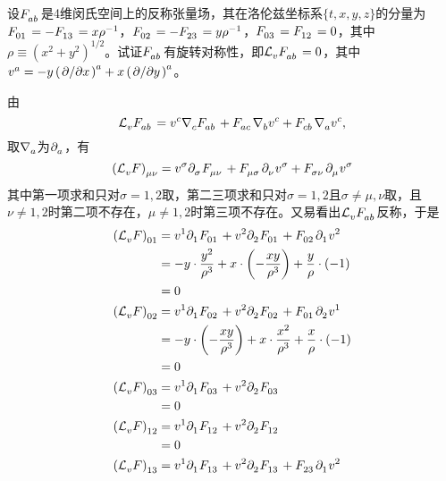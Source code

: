 \begin{xiti}
	\item 设$\tensor{F}{_a_b}$是4维闵氏空间上的反称张量场，其在洛伦兹坐标系$\{t,x,y,z \}$的分量为$\tensor{F}{_0_1}=-\tensor{F}{_1_3}=x \rho^{-1} $，$\tensor{F}{_0_2}=-\tensor{F}{_2_3}=y \rho^{-1} $，$\tensor{F}{_0_3}=\tensor{F}{_1_2}=0 $，其中$\rho\equiv \left(x^2+y^2\right)^{1/2} $。试证$\tensor{F}{_a_b}$有旋转对称性，即$\Ld{v} \tensor{F}{_a_b}=0 $，其中$\tensor{v}{^a}=-y \tensor{\left(\pd{x}\right)}{^a}+x \tensor{\left(\pd{y}\right)}{^a} $。
	
	\begin{zm}
		由\[\Ld{v} \tensor{F}{_a_b} = \tensor{v}{^c} \Nabla{c} \tensor{F}{_a_b} + \tensor{F}{_a_c} \Nabla{b} \tensor{v}{^c} + \tensor{F}{_c_b} \Nabla{a} \tensor{v}{^c},\]取$\Nabla{a}$为$\Partial{a}$，有\[  \tensor{\left(\Ld{v} F\right)}{_\mu_\nu} = \tensor{v}{^\sigma} \Partial{\sigma} \tensor{F}{_\mu_\nu} + \tensor{F}{_\mu_\sigma} \Partial{\nu} \tensor{v}{^\sigma} + \tensor{F}{_\sigma_\nu} \Partial{\mu} \tensor{v}{^\sigma}  \]其中第一项求和只对$\sigma=1,2$取，第二三项求和只对$\sigma=1,2$且$\sigma\neq\mu,\nu$取，且$\nu\neq1,2$时第二项不存在，$\mu\neq1,2$时第三项不存在。又易看出$\Ld{v} \tensor{F}{_a_b} $反称，于是
		\begin{align*}
		\tensor{\left(\Ld{v} F\right)}{_0_1} &= \tensor{v}{^1} \Partial{1} \tensor{F}{_0_1} + \tensor{v}{^2} \Partial{2} \tensor{F}{_0_1} + \tensor{F}{_0_2} \Partial{1} \tensor{v}{^2}\\
		&= -y \cdot \frac{y^2}{\rho^3} + x \cdot \left( - \frac{xy}{\rho^3} \right) +\frac{y}{\rho} \cdot (-1) \\
		&=0\\
		\tensor{\left(\Ld{v} F\right)}{_0_2} &= \tensor{v}{^1} \Partial{1} \tensor{F}{_0_2} + \tensor{v}{^2} \Partial{2} \tensor{F}{_0_2} + \tensor{F}{_0_1} \Partial{2} \tensor{v}{^1} \\
		&= -y \cdot \left( - \frac{xy}{\rho^3} \right) + x \cdot \frac{x^2}{\rho^3} + \frac{x}{\rho} \cdot (-1)\\
		&=0\\
		\tensor{\left(\Ld{v} F\right)}{_0_3} &= \tensor{v}{^1} \Partial{1} \tensor{F}{_0_3} + \tensor{v}{^2} \Partial{2} \tensor{F}{_0_3} \\
		&=0\\
		\tensor{\left(\Ld{v} F\right)}{_1_2} &= \tensor{v}{^1} \Partial{1} \tensor{F}{_1_2} + \tensor{v}{^2} \Partial{2} \tensor{F}{_1_2} \\
		&=0\\
		\tensor{\left(\Ld{v} F\right)}{_1_3} &= \tensor{v}{^1} \Partial{1} \tensor{F}{_1_3} + \tensor{v}{^2} \Partial{2} \tensor{F}{_1_3} + \tensor{F}{_2_3} \Partial{1} \tensor{v}{^2} \\

\end{align*}
\end{zm}
\end{xiti}
